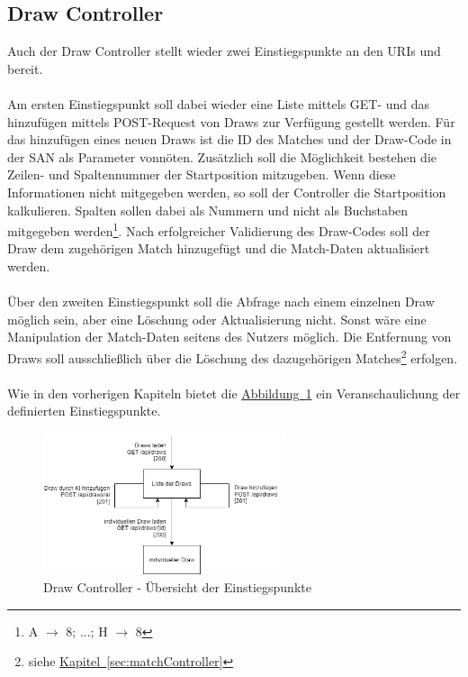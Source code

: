 \subsection{Draw Controller}\label{sec:drawController}
Auch der Draw Controller stellt wieder zwei Einstiegspunkte an den \glspl{URI}  und  bereit. \\
\\
Am ersten Einstiegspunkt soll dabei wieder eine Liste mittels GET- und das hinzufügen mittels POST-Request von Draws zur Verfügung gestellt werden. Für das hinzufügen eines neuen Draws ist die ID des Matches und der Draw-Code in der \gls{SAN} als Parameter vonnöten. Zusätzlich soll die Möglichkeit bestehen die Zeilen- und Spaltennummer der Startposition mitzugeben. Wenn diese Informationen nicht mitgegeben werden, so soll der Controller die Startposition kalkulieren. Spalten sollen dabei als Nummern und nicht als Buchstaben mitgegeben werden\footnote{A $\rightarrow$ 8; ...; H $\rightarrow$ 8}. Nach erfolgreicher Validierung des Draw-Codes soll der Draw dem zugehörigen Match hinzugefügt und die Match-Daten aktualisiert werden.\\
\\
Über den zweiten Einstiegspunkt soll die Abfrage nach einem einzelnen Draw möglich sein, aber eine Löschung oder Aktualisierung nicht. Sonst wäre eine Manipulation der Match-Daten seitens des Nutzers möglich. Die Entfernung von Draws soll ausschließlich über die Löschung des dazugehörigen Matches\footnote{siehe \hyperref[sec:matchController]{Kapitel~\ref{sec:matchController}}} erfolgen.\\
\\
Wie in den vorherigen Kapiteln bietet die \hyperref[fig:drawController]{Abbildung~\ref{fig:drawController}} ein Veranschaulichung der definierten Einstiegspunkte.
\begin{figure}[htb]
	\includegraphics[width=0.637\textwidth]{images/draw-controller.png}
	\caption{Draw Controller - Übersicht der Einstiegspunkte}
	\label{fig:drawController}
\end{figure}

